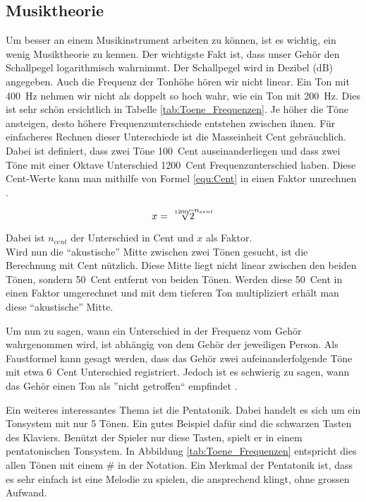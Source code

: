 \subsection{Musiktheorie}\label{subsec:Musiktheorie}

Um besser an einem Musikinstrument arbeiten zu können, ist es wichtig, ein wenig Musiktheorie zu kennen. Der wichtigste Fakt ist, dass unser Gehör den Schallpegel logarithmisch wahrnimmt. Der Schallpegel wird in Dezibel (dB) angegeben. Auch die Frequenz der Tonhöhe hören wir nicht linear. Ein Ton mit \SI{400}{Hz} nehmen wir nicht als doppelt so hoch wahr, wie ein Ton mit \SI{200}{Hz}. Dies ist sehr schön ersichtlich in Tabelle \ref{tab:Toene_Frequenzen}. Je höher die Töne ansteigen, desto höhere Frequenzunterschiede entstehen zwischen ihnen. Für einfacheres Rechnen dieser Unterschiede ist die Masseinheit Cent gebräuchlich. Dabei ist definiert, dass zwei Töne \SI{100}{Cent} auseinanderliegen und dass zwei Töne mit einer Oktave Unterschied \SI{1200}{Cent} Frequenzunterschied haben. Diese Cent-Werte kann man mithilfe von Formel \ref{equ:Cent} in einen Faktor umrechnen \cite{Cent}.

\begin{equation}
x = \sqrt[\leftroot{-2}\uproot{1}1200]{2}^{n_{cent}}
\label{equ:Cent}
\end{equation} 

Dabei ist \(n_{cent}\) der Unterschied in Cent und \(x\) als Faktor.\\
Wird nun die ``akustische'' Mitte zwischen zwei Tönen gesucht, ist die Berechnung mit Cent nützlich. Diese Mitte liegt nicht linear zwischen den beiden Tönen, sondern \SI{50}{Cent} entfernt von beiden Tönen. Werden diese \SI{50}{Cent} in einen Faktor umgerechnet und mit dem tieferen Ton multipliziert erhält man diese ``akustische'' Mitte.

Um nun zu sagen, wann ein Unterschied in der Frequenz vom Gehör wahrgenommen wird, ist abhängig von dem Gehör der jeweiligen Person. Als Faustformel kann gesagt werden, dass das Gehör zwei aufeinanderfolgende Töne mit etwa \SI{6}{Cent} Unterschied registriert. Jedoch ist es schwierig zu sagen, wann das Gehör einen Ton als ''nicht getroffen`` empfindet \cite{Cent}.

Ein weiteres interessantes Thema ist die Pentatonik. Dabei handelt es sich um ein Tonsystem mit nur 5 Tönen. Ein gutes Beispiel dafür sind die schwarzen Tasten des Klaviers. Benützt der Spieler nur diese Tasten, spielt er in einem pentatonischen Tonsystem. In Abbildung \ref{tab:Toene_Frequenzen} entspricht dies allen Tönen mit einem \# in der Notation. Ein Merkmal der Pentatonik ist, dass es sehr einfach ist eine Melodie zu spielen, die ansprechend klingt, ohne grossen Aufwand.\cite{Pentatonik}



